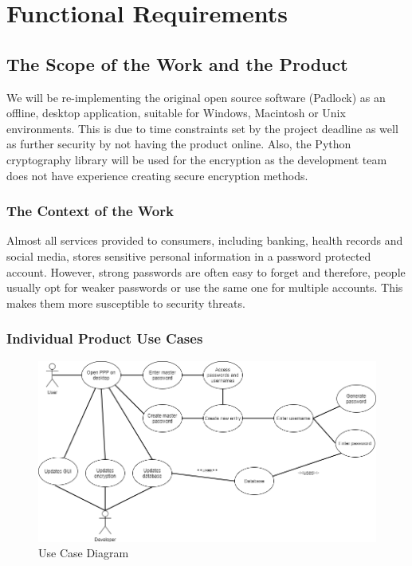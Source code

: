 \documentclass[12pt, titlepage]{article}
\begin{document}
\section{Functional Requirements}

\subsection{The Scope of the Work and the Product}

We will be re-implementing the original open source software (Padlock) as an offline, 
desktop application, suitable for Windows, Macintosh or Unix environments. This is due to time 
constraints set by the project deadline as well as further security by not having the product online. 
Also, the Python cryptography library will be used for the encryption as the development team does not 
have experience creating secure encryption methods. 

\subsubsection{The Context of the Work}

Almost all services provided to consumers, including banking, health records and social media, 
stores sensitive personal information in a password protected account. However, strong passwords are 
often easy to forget and therefore, people usually opt for weaker passwords or use the same 
one for multiple accounts. This makes them more susceptible to security threats.

\subsubsection{Individual Product Use Cases}

\begin{figure}[H]
\includegraphics[scale=0.5]{Images/UseCase.png}
\caption{Use Case Diagram}
\end{figure}
\end{document}
